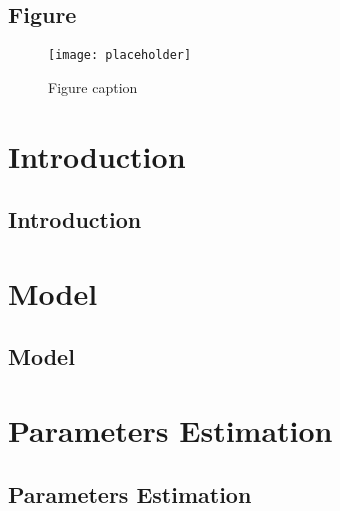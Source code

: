 \documentclass[11pt,fleqn]{book} %
\begin{document}

\section{Figure}

\begin{figure}[h]
\centering\texttt{[image: placeholder]}
\caption{Figure caption}
\end{figure}


\chapter{Introduction}
\section{Introduction}

\chapter{Model}
\section{Model}

\chapter{Parameters Estimation}
\section{Parameters Estimation}


\end{document}
